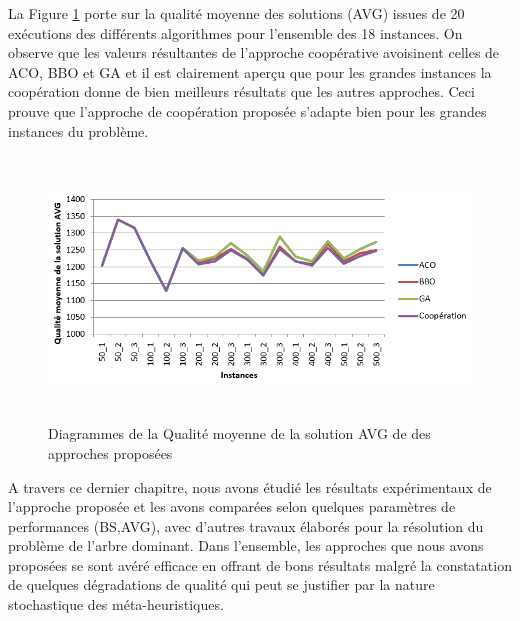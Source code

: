 
La Figure \ref{fig:DQMSAP} porte sur la qualité moyenne des solutions (AVG) issues de 20 exécutions des différents algorithmes pour l’ensemble des 18 instances. On observe
que les valeurs résultantes de l’approche coopérative avoisinent celles de ACO, BBO  et GA et il est clairement aperçu que pour les grandes instances  la coopération donne de bien meilleurs résultats que les autres approches. Ceci prouve que l’approche de coopération proposée  s'adapte bien pour les grandes instances du problème. 


\begin{figure}[H]
	\centering
	\includegraphics[width=16cm,height=7cm]{Chap5/6.png}
	\caption{Diagrammes de la Qualité moyenne de la solution AVG de des approches proposées}
	\label{fig:DQMSAP}
\end{figure}


A travers ce dernier chapitre, nous avons étudié les résultats expérimentaux de l’approche proposée et les avons comparées selon quelques paramètres de performances (BS,AVG), avec d’autres travaux élaborés pour la résolution du problème de l’arbre dominant. Dans l’ensemble, les approches que nous avons proposées se sont  avéré efficace en offrant de bons résultats malgré la constatation de quelques dégradations de qualité qui peut se justifier par la nature stochastique des méta-heuristiques.

